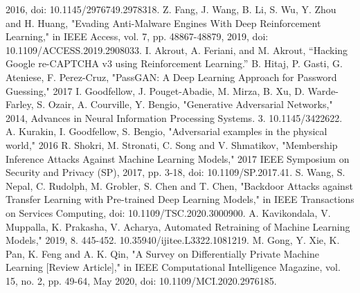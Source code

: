 \documentclass[11pt,conference]{IEEEtran}
\begin{document}
\begin{thebibliography}{00}
        2016, doi: 10.1145/2976749.2978318.
     Z. Fang, J. Wang, B. Li, S. Wu, Y. Zhou and H. Huang,
        "Evading Anti-Malware Engines With Deep Reinforcement Learning," in
        IEEE Access, vol. 7, pp. 48867-48879, 2019, doi:
        10.1109/ACCESS.2019.2908033.
     I. Akrout, A. Feriani, and M. Akrout, “Hacking  Google
        re-CAPTCHA v3 using Reinforcement Learning.”
     B. Hitaj, P. Gasti, G. Ateniese, F. Perez-Cruz, "PassGAN: A Deep Learning Approach for
        Password Guessing," 2017
     I. Goodfellow, J. Pouget-Abadie, M. Mirza, B. Xu, D.
        Warde-Farley, S. Ozair, A. Courville, Y. Bengio, "Generative
        Adversarial Networks," 2014, Advances in Neural
        Information Processing Systems. 3. 10.1145/3422622. 
     A. Kurakin, I. Goodfellow, S. Bengio, "Adversarial examples
        in the physical world," 2016
     R. Shokri, M. Stronati, C. Song and V. Shmatikov, "Membership
        Inference Attacks Against Machine Learning Models," 2017 IEEE Symposium
        on Security and Privacy (SP), 2017, pp. 3-18, doi: 10.1109/SP.2017.41.
     S. Wang, S. Nepal, C. Rudolph, M. Grobler, S. Chen and T.
        Chen, "Backdoor Attacks against Transfer Learning with Pre-trained Deep
        Learning Models," in IEEE Transactions on Services Computing, doi:
        10.1109/TSC.2020.3000900.
     A. Kavikondala, V. Muppalla, K. Prakasha, V. Acharya, Automated Retraining of Machine
        Learning Models," 2019, 8. 445-452. 10.35940/ijitee.L3322.1081219. 
     M. Gong, Y. Xie, K. Pan, K. Feng and A. K. Qin, "A Survey on
        Differentially Private Machine Learning [Review Article]," in IEEE
        Computational Intelligence Magazine, vol. 15, no. 2, pp. 49-64, May
        2020, doi: 10.1109/MCI.2020.2976185.

\end{thebibliography}
\vspace{12pt}
\end{document}
